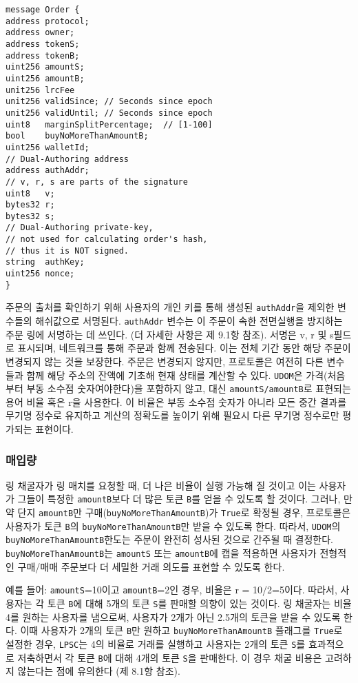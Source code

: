 \documentclass{article}
\begin{document}
\begin{multicols}{2}
\begin{verbatim}
message Order {
address protocol;
address owner;
address tokenS;
address tokenB;
uint256 amountS;
uint256 amountB;
unit256 lrcFee
unit256 validSince; // Seconds since epoch
unit256 validUntil; // Seconds since epoch
uint8   marginSplitPercentage;  // [1-100]
bool    buyNoMoreThanAmountB;
uint256 walletId;
// Dual-Authoring address
address authAddr;
// v, r, s are parts of the signature
uint8   v;       
bytes32 r;
bytes32 s;
// Dual-Authoring private-key,
// not used for calculating order's hash,
// thus it is NOT signed.
string  authKey;          
uint256 nonce;
}
\end{verbatim}


주문의 출처를 확인하기 위해 사용자의 개인 키를 통해 생성된 \verb|authAddr|을 제외한 변수들의 해쉬값으로 서명된다. \verb|authAddr| 변수는 이 주문이 속한 전면실행을 방지하는 주문 링에 서명하는 데 쓰인다. (더 자세한 사항은 제 9.1항 참조). 서명은 v, r 및 s필드로 표시되며, 네트워크를 통해 주문과 함께 전송된다. 이는 전체 기간 동안 해당 주문이 변경되지 않는 것을 보장한다. 주문은 변경되지 않지만, 프로토콜은 여전히 다른 변수들과 함께 해당 주소의 잔액에 기초해 현재 상태를 계산할 수 있다.
\verb|UDOM|은 가격(처음부터 부동 소수점 숫자여야한다)을 포함하지 않고, 대신 \verb|amountS/amountB|로 표현되는 용어 비율 혹은 r을 사용한다. 이 비율은 부동 소수점 숫자가 아니라 모든 중간 결과를 무기명 정수로 유지하고 계산의 정확도를 높이기 위해 필요시 다른 무기명 정수로만 평가되는 표현이다.


\subsubsection{매입량}

링 채굴자가 링 매치를 요청할 때, 더 나은 비율이 실행 가능해 질 것이고 이는 사용자가 그들이 특정한 \verb|amountB|보다 더 많은 토큰 \verb|B|를 얻을 수 있도록 할 것이다. 그러나, 만약 단지 \verb|amountB|만 구매(\verb|buyNoMoreThanAmountB|)가 \verb|True|로 확정될 경우, 프로토콜은 사용자가 토큰 \verb|B|의 \verb|buyNoMoreThanAmountB|만 받을 수 있도록 한다. 따라서, \verb|UDOM|의 \verb|buyNoMoreThanAmountB|한도는 주문이 완전히 성사된 것으로 간주될 때 결정한다. \verb|buyNoMoreThanAmountB|는 \verb|amountS| 또는 \verb|amountB|에 캡을 적용하면 사용자가 전형적인 구매/매매 주문보다 더 세밀한 거래 의도를 표현할 수 있도록 한다.

예를 들어: \verb|amountS|=10이고 \verb|amountB|=2인 경우, 비율은  r = 10/2=5이다. 따라서, 사용자는 각 토큰 \verb|B|에 대해 5개의 토큰 \verb|S|를 판매할 의향이 있는 것이다. 링 채굴자는 비율 4를 원하는 사용자를 냄으로써, 사용자가 2개가 아닌 2.5개의 토큰을 받을 수 있도록 한다. 이때 사용자가 2개의 토큰 \verb|B|만 원하고 \verb|buyNoMoreThanAmountB| 플래그를 \verb|True|로 설정한 경우, \verb|LPSC|는 4의 비율로 거래를 실행하고 사용자는 2개의 토큰 \verb|S|를 효과적으로 저축하면서 각 토큰 \verb|B|에 대해 4개의 토큰 \verb|S|을 판매한다. 이 경우 채굴 비용은 고려하지 않는다는 점에 유의한다 (제 8.1항 참조).




\end{multicols}
\end{document}
